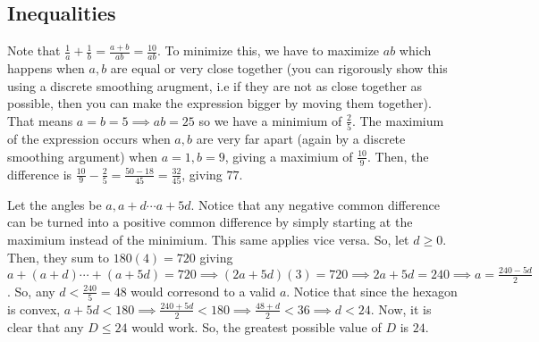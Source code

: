 \documentclass[11pt]{article}
\begin{document}
\subsection{Inequalities}

\begin{sol}
Note that $\frac{1}{a}+\frac{1}{b}=\frac{a+b}{ab}=\frac{10}{ab}$. To minimize this, we have to maximize $ab$ which happens when $a,b$ are equal or very close together (you can rigorously show this using a discrete smoothing arugment, i.e if they are not as close together as possible, then you can make the expression bigger by moving them together). That means $a=b=5\implies ab=25$ so we have a minimium of $\frac{2}{5}$. The maximium of the expression occurs when $a,b$ are very far apart (again by a discrete smoothing argument) when $a=1, b=9$, giving a maximium of $\frac{10}{9}$. Then, the difference is $\frac{10}{9}-\frac{2}{5}=\frac{50-18}{45}=\frac{32}{45}$, giving $\boxed{77}$.
\end{sol}


\begin{sol}
Let the angles be $a,a+d\cdots a+5d$.  Notice that any negative common difference can be turned into a positive common difference by simply starting at the maximium instead of the minimium. This same applies vice versa. So, let $d\ge 0$. Then, they sum to $180(4)=720$ giving $a+(a+d)\cdots + (a+5d)=720\implies (2a+5d)(3)=720\implies 2a+5d=240\implies a =\frac{240-5d}{2}$. So, any $d<\frac{240}{5}=48$ would corresond to a valid $a$. Notice that since the hexagon is convex, $a+5d<180\implies \frac{240+5d}{2} < 180 \implies \frac{48+d}{2} < 36\implies d < 24$. Now, it is clear that any $D\leq 24$ would work. So, the greatest possible value of $D$ is $\boxed{24}$.
\end{sol}

\end{document}
